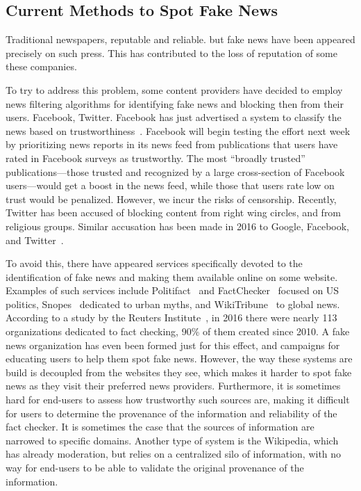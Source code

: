 \documentclass[letterpaper,twocolumn,10pt]{article}
\newcommand{\mypara}[1]{\vspace{5pt}\noindent{\bf {#1}}}
\begin{document}
\subsection{Current Methods to Spot Fake News}

Traditional newspapers, reputable and reliable. but fake news have been appeared precisely on such press. This has contributed to the loss of reputation of some these companies.

\mypara{Content refereeing.} To try to address this problem, some content providers have decided to employ news filtering algorithms for identifying fake news and blocking then from their users. Facebook, Twitter. Facebook has just advertised a system to classify the news based on trustworthiness~\cite{fbrank}. Facebook will begin testing the effort next week by prioritizing news reports in its news feed from publications that users have rated in Facebook surveys as trustworthy. The most ``broadly trusted'' publications—those trusted and recognized by a large cross-section of Facebook users—would get a boost in the news feed, while those that users rate low on trust would be penalized. However, we incur the risks of censorship. Recently, Twitter has been accused of blocking content from right wing circles, and from religious groups. Similar accusation has been made in 2016 to Google, Facebook, and Twitter~\cite{accusedskew}.

\mypara{Fact checkers.} To avoid this, there have appeared services specifically devoted to the identification of fake news and making them available online on some website. Examples of such services include Politifact~\cite{politifact} and FactChecker~\cite{factchecker} focused on US politics, Snopes~\cite{snopes} dedicated to urban myths, and WikiTribune~\cite{wikitribune} to global news. According to a study by the Reuters Institute~\cite{risefackchecking}, in 2016 there were nearly 113 organizations dedicated to fact checking, 90\% of them created since 2010. A fake news organization has even been formed just for this effect, and campaigns for educating users to help them spot fake news. However, the way these systems are build is decoupled from the websites they see, which makes it harder to spot fake news as they visit their preferred news providers. Furthermore, it is sometimes hard for end-users to assess how trustworthy such sources are, making it difficult for users to determine the provenance of the information and reliability of the fact checker. It is sometimes the case that the sources of information are narrowed to specific domains. Another type of system is the Wikipedia, which has already moderation, but relies on a centralized silo of information, with no way for end-users to be able to validate the original provenance of the information.
\end{document}
